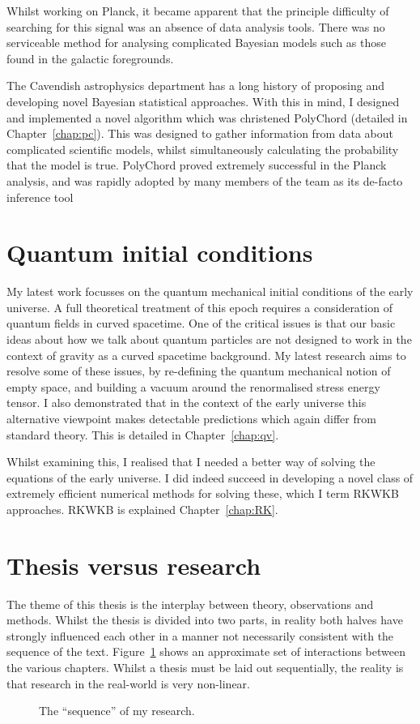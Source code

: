 Whilst working on Planck, it became apparent that the principle difficulty of searching for this signal was an absence of data analysis tools. There was no serviceable method for analysing complicated Bayesian models such as those found in the galactic foregrounds.

The Cavendish astrophysics department has a long history of proposing and developing novel Bayesian statistical approaches. With this in mind, I designed and implemented a novel algorithm which was christened PolyChord (detailed in Chapter~\ref{chap:pc}). This was designed to gather information from data about complicated scientific models, whilst simultaneously calculating the probability that the model is true. PolyChord proved extremely successful in the Planck analysis, and was rapidly adopted by many members of the team as its de-facto inference tool

\section{Quantum initial conditions}
My latest work focusses on the quantum mechanical initial conditions of the early universe. A full theoretical treatment of this epoch requires a consideration of quantum fields in curved spacetime. One of the critical issues is that our basic ideas about how we talk about quantum particles are not designed to work in the context of gravity as a curved spacetime background. My latest research aims to resolve some of these issues, by re-defining the quantum mechanical notion of empty space, and building a vacuum around the renormalised stress energy tensor. I also demonstrated that in the context of the early universe this alternative viewpoint makes detectable predictions which again differ from standard theory. This is detailed in Chapter~\ref{chap:qv}.

Whilst examining this, I realised that I needed a better way of solving the equations of the early universe. I did indeed succeed in developing a novel class of extremely efficient numerical methods for solving these, which I term RKWKB approaches. RKWKB is explained Chapter~\ref{chap:RK}.

\section{Thesis versus research}

The theme of this thesis is the interplay between theory, observations and methods. Whilst the thesis is divided into two parts, in reality both halves have strongly influenced each other in a manner not necessarily consistent with the sequence of the text. Figure~\ref{fig:out:sequence} shows an approximate set of interactions between the various chapters. Whilst a thesis must be laid out sequentially, the reality is that research in the real-world is very non-linear.

\begin{figure}[tp]
  
  \caption{The ``sequence'' of my research.}\label{fig:out:sequence}
\end{figure}





